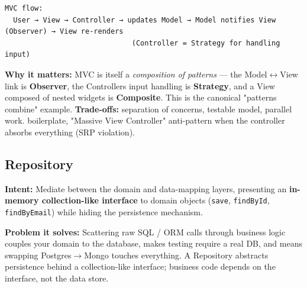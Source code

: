 \documentclass[11pt]{article}
\begin{document}
\setcodelang{}

\begin{verbatim}
MVC flow:
  User → View → Controller → updates Model → Model notifies View (Observer) → View re-renders
                              (Controller = Strategy for handling input)
\end{verbatim}

\textbf{Why it matters:} MVC is itself a \emph{composition of patterns} --- the Model\(\leftrightarrow\)View link is \textbf{Observer}, the Controller\textquotesingle s input handling is \textbf{Strategy}, and a View composed of nested widgets is \textbf{Composite}. This is the canonical "patterns combine" example. \textbf{Trade-offs:} separation of concerns, testable model, parallel work. boilerplate, "Massive View Controller" anti-pattern when the controller absorbs everything (SRP violation).

\subsection{Repository}\label{repository}

\textbf{Intent:} Mediate between the domain and data-mapping layers, presenting an \textbf{in-memory collection-like interface} to domain objects (\texttt{save}, \texttt{findById}, \texttt{findByEmail}) while hiding the persistence mechanism.

\textbf{Problem it solves:} Scattering raw SQL / ORM calls through business logic couples your domain to the database, makes testing require a real DB, and means swapping Postgres\(\rightarrow\)Mongo touches everything. A Repository abstracts persistence behind a collection-like interface; business code depends on the interface, not the data store.

\end{document}
